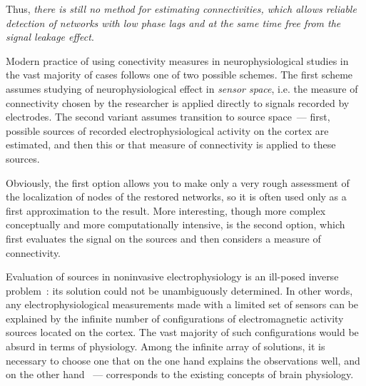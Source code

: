 Thus, \emph{ there is still no method for estimating connectivities, which
allows reliable detection of networks with low phase lags and at the same time
free from the signal leakage effect}.



Modern practice of using conectivity measures in neurophysiological studies in
the vast majority of cases follows one of two possible schemes.  The first
scheme assumes studying of neurophysiological effect in \emph{sensor space},
i.e. the measure of connectivity chosen by the researcher is applied directly
to signals recorded by electrodes.  The second variant assumes transition to
source space~--- first, possible sources of recorded electrophysiological
activity on the cortex are estimated, and then this or that measure of
connectivity is applied to these sources.

Obviously, the first option allows you to make only a very rough assessment of
the localization of nodes of the restored networks, so it is often used only as
a first approximation to the result.  More interesting, though more complex
conceptually and more computationally intensive, is the second option, which
first evaluates the signal on the sources and then considers a measure of
connectivity.

Evaluation of sources in noninvasive electrophysiology is an ill-posed inverse
problem~\cite{Hamalainen1993}: its solution could not be unambiguously
determined. In other words, any electrophysiological measurements made with a
limited set of sensors can be explained by the infinite number of
configurations of electromagnetic activity sources located on the cortex. The
vast majority of such configurations would be absurd in terms of physiology.
Among the infinite array of solutions, it is necessary to choose one that on
the one hand explains the observations well, and on the other hand ~---
corresponds to the existing concepts of brain physiology.

